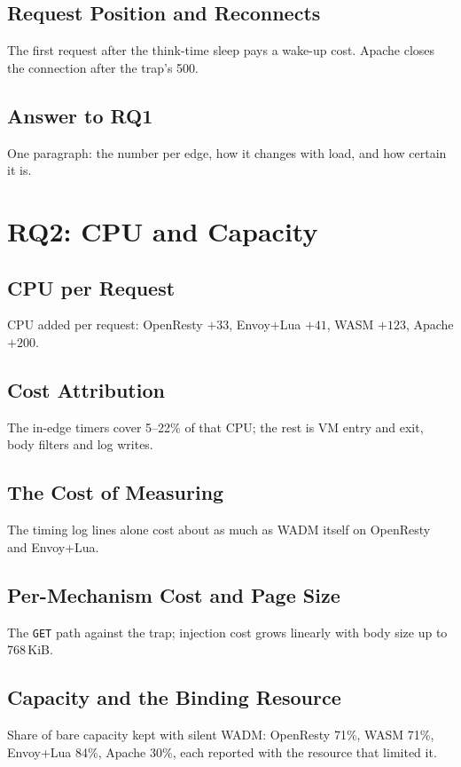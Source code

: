\documentclass{rptuma}
\begin{document}
\subsection{Request Position and Reconnects}
The first request after the think-time sleep pays a wake-up cost. Apache closes the connection
after the trap's 500.
\subsection{Answer to RQ1}
One paragraph: the number per edge, how it changes with load, and how certain it is.

\section{RQ2: CPU and Capacity}
\subsection{CPU per Request}
CPU added per request: OpenResty $+33$, Envoy+Lua $+41$, WASM $+123$, Apache $+200$\us.
\subsection{Cost Attribution}
The in-edge timers cover 5--22\% of that CPU; the rest is VM entry and exit, body filters and log
writes.
\subsection{The Cost of Measuring}
The timing log lines alone cost about as much as WADM itself on OpenResty and Envoy+Lua.
\subsection{Per-Mechanism Cost and Page Size}
The \texttt{GET} path against the trap; injection cost grows linearly with body size up to
768\,KiB.
\subsection{Capacity and the Binding Resource}
Share of bare capacity kept with silent WADM: OpenResty 71\%, WASM 71\%, Envoy+Lua 84\%, Apache
30\%, each reported with the resource that limited it.
\end{document}
